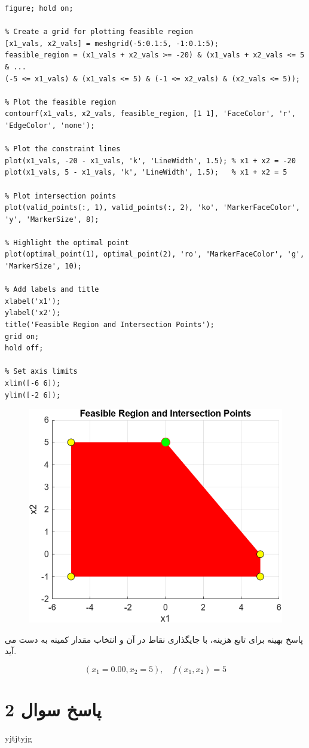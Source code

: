 \begin{latin}
\begin{lstlisting}[frame=single,style=Matlab-Pyglike]
% Step 7: Plot the feasible region and the intersection points
figure; hold on;

% Create a grid for plotting feasible region
[x1_vals, x2_vals] = meshgrid(-5:0.1:5, -1:0.1:5);
feasible_region = (x1_vals + x2_vals >= -20) & (x1_vals + x2_vals <= 5 & ...
(-5 <= x1_vals) & (x1_vals <= 5) & (-1 <= x2_vals) & (x2_vals <= 5));

% Plot the feasible region
contourf(x1_vals, x2_vals, feasible_region, [1 1], 'FaceColor', 'r', 'EdgeColor', 'none');

% Plot the constraint lines
plot(x1_vals, -20 - x1_vals, 'k', 'LineWidth', 1.5); % x1 + x2 = -20
plot(x1_vals, 5 - x1_vals, 'k', 'LineWidth', 1.5);   % x1 + x2 = 5

% Plot intersection points
plot(valid_points(:, 1), valid_points(:, 2), 'ko', 'MarkerFaceColor', 'y', 'MarkerSize', 8);

% Highlight the optimal point
plot(optimal_point(1), optimal_point(2), 'ro', 'MarkerFaceColor', 'g', 'MarkerSize', 10);

% Add labels and title
xlabel('x1');
ylabel('x2');
title('Feasible Region and Intersection Points');
grid on;
hold off;

% Set axis limits
xlim([-6 6]);
ylim([-2 6]);

	\end{lstlisting}
\end{latin}


\begin{figure}[H]
	\centering
	\includegraphics[width=1\linewidth]{../img/Q2_1}
	\caption{}
	\label{fig:q21}
\end{figure}

پاسخ بهینه برای تابع هزینه، با جایگذاری نقاط در آن و انتخاب مقدار کمینه به دست می آید.

\[
(x_1 = 0.00, x_2 = 5) , \quad f(x_1, x_2) = 5
\]

\section{پاسخ سوال 2}

yjtjtyjg
